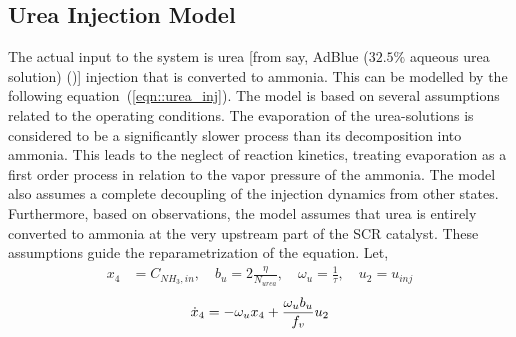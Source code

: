 \subsection{Urea Injection Model}

The actual input to the system is urea [from say, AdBlue ($32.5\%$ aqueous urea
solution) (\cite{nova2014urea})] injection that is converted to ammonia. This can be modelled by the following equation~(\ref{eqn::urea_inj}). The model is based on several assumptions related to the operating conditions. The evaporation of the urea-solutions is considered to be a significantly slower process than its decomposition into ammonia. This leads to the neglect of reaction kinetics, treating evaporation as a first order process in relation to the vapor pressure of the ammonia. The model also assumes a complete decoupling of the injection dynamics from other states. Furthermore, based on observations, the model assumes that urea is entirely converted to ammonia at the very upstream part of the SCR catalyst. These assumptions guide the reparametrization of the equation.
Let,
\begin{align*}
    x_4 &= C_{NH_3, in}, \quad b_u = 2 \frac{ \eta}{N_{urea}}, \quad \omega_u = \frac{1}{\tau}, \quad u_2 = u_{inj}
\end{align*}
\begin{equation}{\label{eqn::urea_inj}}
    \dot x_4 = - \omega_u x_4 +   \frac{\omega_u b_u}{f_v} u_{2}
\end{equation}
